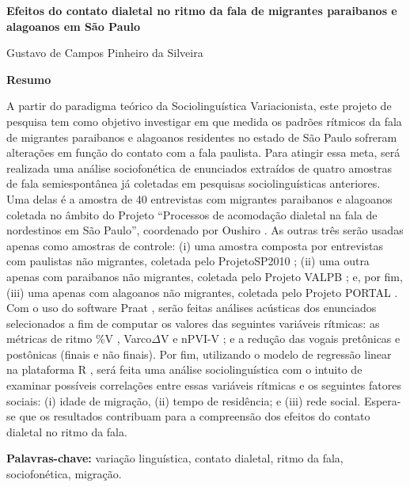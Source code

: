 \documentclass[a4paper, 12pt, article, oneside, brazil,leqno]{memoir}
\begin{document}
	\thispagestyle{empty}
	
	\begin{center}
		\vspace*{\fill}
	{\Large\bfseries Efeitos do contato dialetal no ritmo da fala de migrantes paraibanos e alagoanos em São Paulo}
	\par\vspace*{\fill}\vspace*{\fill}
	{\large Gustavo de Campos Pinheiro da Silveira}
	\vspace*{\fill}\vspace*{\fill}\vspace*{\fill}
		\end{center}
	{\bfseries Resumo}

	
	\noindent A partir do paradigma teórico da Sociolinguística Variacionista, este projeto de pesquisa tem como objetivo investigar em que medida os padrões rítmicos da fala de migrantes paraibanos e alagoanos residentes no estado de São Paulo sofreram alterações em função do contato com a fala paulista. Para atingir essa meta, será realizada uma análise sociofonética de enunciados extraídos de quatro amostras de fala semiespontânea já coletadas em pesquisas sociolinguísticas anteriores. Uma delas é a amostra de 40 entrevistas com migrantes paraibanos e alagoanos coletada no âmbito do Projeto \enquote{Processos de acomodação dialetal na fala de nordestinos em São Paulo}, coordenado por Oushiro \citeyear{oushiro2018}. As outras três serão usadas apenas como amostras de controle: (i) uma amostra composta por entrevistas com paulistas não migrantes, coletada pelo ProjetoSP2010 \cite{mendes2012}; (ii) uma outra apenas com paraibanos não migrantes, coletada pelo Projeto VALPB \cite{hora1993}; e, por fim, (iii) uma apenas com alagoanos não migrantes, coletada pelo Projeto PORTAL \cite{oliveira2017}. Com o uso do software Praat \cite{boersma2019}, serão feitas análises acústicas dos enunciados selecionados a fim de computar os valores das seguintes variáveis rítmicas: as métricas de ritmo \%V \cite{ramus1999}, Varco$\Delta$V \cite{white2007a} e nPVI-V \cite{grabe2002}; e a redução das vogais pretônicas e postônicas (finais e não finais). Por fim, utilizando o modelo de regressão linear na plataforma R \cite{rcoreteam2019}, será feita uma análise sociolinguística com o intuito de examinar possíveis correlações entre essas variáveis rítmicas e os seguintes fatores sociais: (i) idade de migração, (ii) tempo de residência; e (iii) rede social. Espera-se que os resultados contribuam para a compreensão dos efeitos do contato dialetal no ritmo da fala.
	
\vspace{.5em}\noindent\textbf{Palavras-chave:} variação linguística, contato dialetal, ritmo da fala, sociofonética, migração.
	
	\printbibliography
\end{document}
